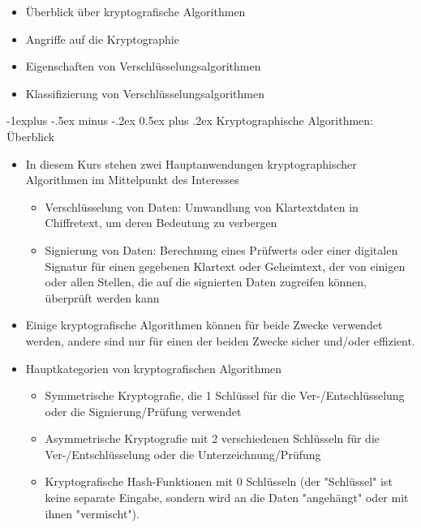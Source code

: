 \documentclass[a4paper]{article}
\makeatletter
\renewcommand{\subsection}{\@startsection{subsection}{2}{0mm}%
 {-1explus -.5ex minus -.2ex}%
 {0.5ex plus .2ex}%
 {\normalfont\normalsize\bfseries}}
\makeatother
\begin{document}
\begin{multicols}{3}
    \begin{itemize}
        \item
              Überblick über kryptografische Algorithmen
        \item
              Angriffe auf die Kryptographie
        \item
              Eigenschaften von Verschlüsselungsalgorithmen
        \item
              Klassifizierung von Verschlüsselungsalgorithmen
    \end{itemize}


    \subsection{Kryptographische Algorithmen:
        Überblick}

    \begin{itemize}
        \item
              In diesem Kurs stehen zwei Hauptanwendungen kryptographischer
              Algorithmen im Mittelpunkt des Interesses

              \begin{itemize}
                  \item
                        Verschlüsselung von Daten: Umwandlung von Klartextdaten in
                        Chiffretext, um deren Bedeutung zu verbergen
                  \item
                        Signierung von Daten: Berechnung eines Prüfwerts oder einer
                        digitalen Signatur für einen gegebenen Klartext oder Geheimtext, der
                        von einigen oder allen Stellen, die auf die signierten Daten
                        zugreifen können, überprüft werden kann
              \end{itemize}
        \item
              Einige kryptografische Algorithmen können für beide Zwecke verwendet
              werden, andere sind nur für einen der beiden Zwecke sicher und/oder
              effizient.
        \item
              Hauptkategorien von kryptografischen Algorithmen

              \begin{itemize}
                  \item
                        Symmetrische Kryptografie, die 1 Schlüssel für die
                        Ver-/Entschlüsselung oder die Signierung/Prüfung verwendet
                  \item
                        Asymmetrische Kryptografie mit 2 verschiedenen Schlüsseln für die
                        Ver-/Entschlüsselung oder die Unterzeichnung/Prüfung
                  \item
                        Kryptografische Hash-Funktionen mit 0 Schlüsseln (der "Schlüssel"
                        ist keine separate Eingabe, sondern wird an die Daten "angehängt"
                        oder mit ihnen "vermischt").
              \end{itemize}
    \end{itemize}



\end{multicols}
\end{document}
